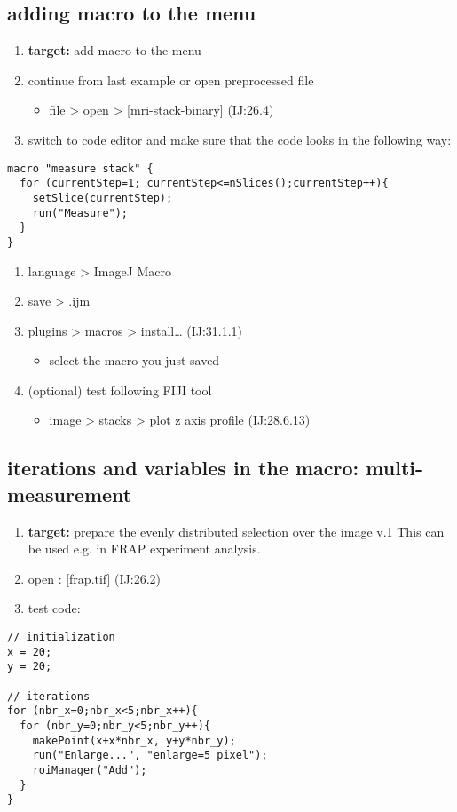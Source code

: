 \documentclass[11pt]{article}
\begin{document}
\subsection{adding macro to the menu}
\label{sec-7-5}
\begin{enumerate}
\item \textbf{target:} add macro to the menu
\item continue from last example or open preprocessed file
\begin{itemize}
\item file > open > [mri-stack-binary] (IJ:26.4)
\end{itemize}
\item switch to code editor and make sure that the code looks in the
following way:
\end{enumerate}
\begin{verbatim}
macro "measure stack" {
  for (currentStep=1; currentStep<=nSlices();currentStep++){
	setSlice(currentStep);
	run("Measure");
  }
}
\end{verbatim}
\begin{enumerate}
\item language > ImageJ Macro
\item save > .ijm
\item plugins > macros > install\ldots{} (IJ:31.1.1) 
\begin{itemize}
\item select the macro you just saved
\end{itemize}
\item (optional) test following FIJI tool
\begin{itemize}
\item image > stacks > plot z axis profile (IJ:28.6.13)
\end{itemize}
\end{enumerate}

\subsection{iterations and variables in the macro: multi-measurement}
\label{sec-7-6}
\begin{enumerate}
\item \textbf{target:} prepare the evenly distributed selection over the
image v.1 This can be used e.g. in FRAP experiment analysis.
\item open : [frap.tif] (IJ:26.2)
\item test code:
\end{enumerate}
\begin{verbatim}
// initialization
x = 20;
y = 20;

// iterations
for (nbr_x=0;nbr_x<5;nbr_x++){
  for (nbr_y=0;nbr_y<5;nbr_y++){
	makePoint(x+x*nbr_x, y+y*nbr_y);
	run("Enlarge...", "enlarge=5 pixel");
	roiManager("Add");
  }
}
\end{verbatim}
\end{document}
